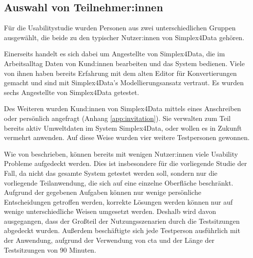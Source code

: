 \subsection{Auswahl von Teilnehmer:innen}

Für die Usabilitystudie wurden Personen aus zwei unterschiedlichen Gruppen ausgewählt, die beide zu den typischer Nutzer:innen von Simplex4Data gehören.

Einerseits handelt es sich dabei um Angestellte von Simplex4Data, die im Arbeitsalltag Daten von Kund:innen bearbeiten und das System bedienen. Viele von ihnen haben bereits Erfahrung mit dem alten Editor für Konvertierungen gemacht und sind mit Simplex4Data's Modellierungsansatz vertraut. Es wurden sechs Angestellte von Simplex4Data getestet.

Des Weiteren wurden Kund:innen von Simplex4Data mittels eines Anschreiben oder persönlich angefragt (Anhang \ref{app:invitation}). Sie verwalten zum Teil bereits aktiv Umweltdaten im System Simplex4Data, oder wollen es in Zukunft vermehrt anwenden. Auf diese Weise wurden vier weitere Testpersonen gewonnen.

Wie von \textcite{nielsenWhyYou2000} beschrieben, können bereits mit wenigen Nutzer:innen viele Usability Probleme aufgedeckt werden. Dies ist insbesondere für die vorliegende Studie der Fall, da nicht das gesamte System getestet werden soll, sondern nur die vorliegende Teilanwendung, die sich auf eine einzelne Oberfläche beschränkt. Aufgrund der gegebenen Aufgaben können nur wenige persönliche Entscheidungen getroffen werden, korrekte Lösungen werden können nur auf wenige unterschiedliche Weisen umgesetzt werden. Deshalb wird davon ausgegangen, dass der Großteil der Nutzungsszenarien durch die Testsitzungen abgedeckt wurden. Außerdem beschäftigte sich jede Testperson ausführlich mit der Anwendung, aufgrund der Verwendung von \ac{cta} und der Länge der Testsitzungen von 90 Minuten.
